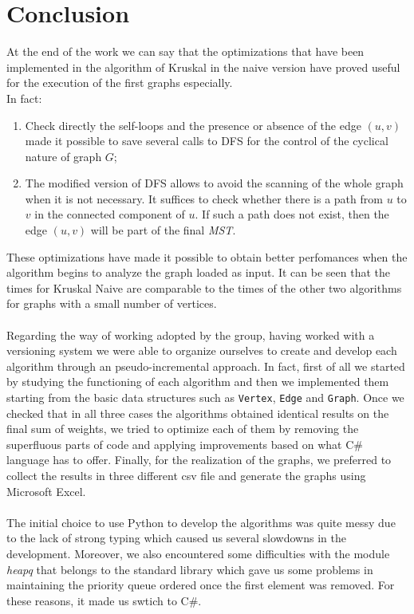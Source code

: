 \section{Conclusion}
At the end of the work we can say that the optimizations that have been implemented in the algorithm of Kruskal in the naive version have proved useful for the execution of the first graphs especially. \\
\noindent
In fact:
\begin{enumerate}
    \item Check directly the self-loops and the presence or absence of the edge $(u, v)$ made it possible to save several calls to DFS for the control of the cyclical nature of graph $G$;
    \item The modified version of DFS allows to avoid the scanning of the whole graph when it is not necessary. It suffices to check whether there is a path from $u$ to $v$ in the connected component of $u$. If such a path does not exist, then the edge $(u, v)$ will be part of the final \textit{MST}.
\end{enumerate}
\noindent
These optimizations have made it possible to obtain better perfomances when the algorithm begins to analyze the graph loaded as input. It can be seen that the times for Kruskal Naive are comparable to the times of the other two algorithms for graphs with a small number of vertices. \\
\\
\noindent
Regarding the way of working adopted by the group, having worked with a versioning system we were able to organize ourselves to create and develop each algorithm through an pseudo-incremental approach. In fact, first of all we started by studying the functioning of each algorithm and then we implemented them starting from the basic data structures such as \verb|Vertex|, \verb|Edge| and \verb|Graph|. Once we checked that in all three cases the algorithms obtained identical results on the final sum of weights, we tried to optimize each of them by removing the superfluous parts of code and applying improvements based on what C\# language has to offer. Finally, for the realization of the graphs, we preferred to collect the results in three different csv file and generate the graphs using Microsoft Excel. \\
\\
\noindent
The initial choice to use Python to develop the algorithms was quite messy due to the lack of strong typing which caused us several slowdowns in the development. Moreover, we also encountered some difficulties with the module \textit{heapq} that belongs to the standard library which gave us some problems in maintaining the priority queue ordered once the first element was removed. For these reasons, it made us swtich to C\#. \\

